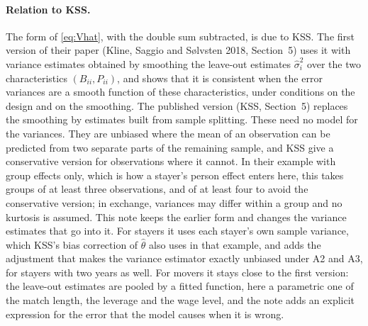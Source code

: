 \paragraph{Relation to KSS.} The form of \eqref{eq:Vhat}, with the double sum subtracted, is due to KSS. The
first version of their paper (Kline, Saggio and S{\o}lvsten 2018, Section~5) uses it with variance estimates
obtained by smoothing the leave-out estimates $\hat\sigma_i^2$ over the two characteristics $(B_{ii},P_{ii})$,
and shows that it is consistent when the error variances are a smooth function of these characteristics, under
conditions on the design and on the smoothing. The
published version (KSS, Section~5) replaces the smoothing by estimates built from sample splitting. These need
no model for the variances. They are unbiased where the mean of an observation can be predicted from two
separate parts of the remaining sample, and KSS give a conservative version for observations where it cannot.
In their example with group effects only, which is how a stayer's person effect enters here, this takes groups of at least three
observations, and of at least four to avoid the conservative version; in exchange, variances may differ within
a group and no kurtosis is assumed. This note keeps the earlier form and changes the variance estimates that
go into it. For stayers it uses each stayer's own sample variance, which KSS's bias correction of $\hat\theta$
also uses in that example, and adds the adjustment that makes the variance estimator exactly unbiased under A2
and A3, for stayers with two years as well. For movers it stays close to the first version: the leave-out estimates are pooled
by a fitted function, here a parametric one of the match length, the leverage and the wage level, and the note
adds an explicit expression for the error that the model causes when it is wrong.
